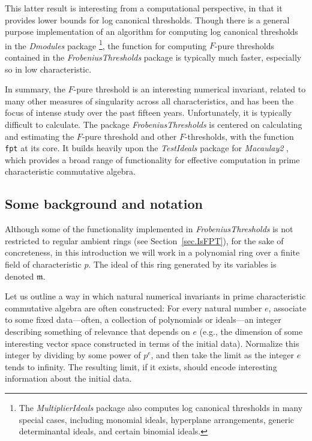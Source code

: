 \documentclass{amsart}
\newcommand{\idealm}{\mathfrak{m}}
\begin{document}
This latter result is interesting from a computational perspective, in that it provides lower bounds for log canonical thresholds.
Though there is a general purpose implementation of an algorithm for computing log canonical thresholds in the \emph{Dmodules} package \cite{DmodulesSource}\footnote{The \emph{MultiplierIdeals} package \cite{MultiplierIdealsPackage, MultiplierIdealsArticle} also computes log canonical thresholds in many special cases, including monomial ideals, hyperplane arrangements, generic determinantal ideals, and certain binomial ideals.
}, the function for computing $F$-pure thresholds contained in the \emph{FrobeniusThresholds} package is typically much faster, especially so in low characteristic.

In summary,  the $F$-pure threshold is an interesting numerical invariant, related to many other measures of singularity across all characteristics, and has been the focus of intense study over the past fifteen years.
Unfortunately, it is typically difficult to calculate.
The package \emph{FrobeniusThresholds} is centered on calculating and estimating the $F$-pure threshold and other $F$-thresholds, with the function \texttt{fpt} at its core.
It builds heavily upon the \emph{TestIdeals} package for \emph{Macaulay2} \cite{TestIdealsPackage, TestIdealsPaper}, which provides a broad range of functionality for effective computation in prime characteristic commutative algebra.

\subsection{Some background and notation}
Although some of the functionality implemented in \emph{FrobeniusThresholds} is not restricted to regular ambient rings (see Section~\ref{sec.IsFPT}), for the sake of concreteness, in this introduction  we will work in a polynomial ring over a finite field of  characteristic $p$. 
The ideal of this ring generated by its variables is denoted $\idealm$.

Let us outline a way in which natural numerical invariants in prime characteristic commutative algebra are often constructed:  For every natural number $e$, associate to some fixed data---often, a collection of polynomials or ideals---an integer describing something of relevance that depends on $e$ (e.g., the dimension of some interesting vector space constructed in terms of the initial data).
Normalize this integer by dividing by some power of $p^e$, and then take the limit as the integer $e$ tends to infinity.
The resulting limit, if it exists, should encode interesting information about the initial data.
\end{document}
